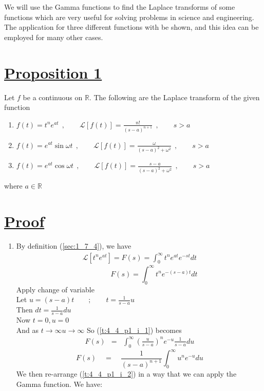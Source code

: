 \documentclass[11pt]{report}
\newcommand{\ubt}[1]{\textbf{\underline{#1}}}
\newcommand{\refn}[1]{(\ref{#1})}
\newcommand{\dsp}{\displaystyle}
\newcommand{\real}{ \mathbb{R}}
\newcommand{\Laplace}{\mathcal{L}}
\newcommand{\ft}{f(t)}
\newcommand{\LFn}[1]{\Laplace \sbracket{#1}}
\newcommand{\LFt}{\Laplace \sbracket{\ft}}
\newcommand{\sbracket}[1]{\left[#1\right]}
\newcommand{\proposition}[1]{\section*{\ubt{Proposition #1}}}
\begin{document}
	We will use the Gamma functions to find the Laplace transforms of some functions which are very useful for solving problems in science and engineering. The application for three different functions with be shown, and this idea can be employed for many other cases. 
	
	\proposition{1}
	Let $f$ be a continuous on $\real$. The following are the Laplace transform of the given function
	\begin{enumerate}
		\item $\dsp f(t) = t^ne^{at}~~,\qquad \LFt = \frac{n!}{(s-a)^{n+1}}~~, \qquad s > a $
		
		\item $\dsp f(t) = e^{at}\sin \omega t~~, \qquad \LFt = \frac{\omega}{(s-a)^2 + \omega^2}~~, \qquad s > a $
		
		\item $\dsp \ft = e^{at}\cos\omega t~~, \qquad \LFt = \frac{s-a}{(s-a)^2 + \omega^2}~~, \qquad s > a $
	\end{enumerate}
	where $a \in \real$
	
	\section*{\ubt{Proof}}
	\begin{enumerate}
		\item By definition \refn{sec:1_7_4}, we have
			\begin{eqnarray*}
				\LFn{t^ne^{at}} = F(s) = \int_0^\infty t^n e^{at} e^{-st}dt
			\end{eqnarray*}
			\begin{equation}
				{\qquad\qquad}F(s) = \int_0^\infty t^n e^{-(s-a)t}dt 	\tag{1}\label{t:4_4_p1_i_1}
			\end{equation}
			Apply change of variable\\
			Let $u=(s-a)t \qquad ; \qquad  t=\frac{1}{s-a}u$\\
			Then $dt = \frac{1}{s-a}du$\\
			Now $t=0, u= 0$\\
			And as $t\to \infty u \to \infty$
			So \refn{t:4_4_p1_i_1} becomes
			\begin{eqnarray*}
				F(s) &=& \int_0^\infty\left(\frac{u}{s-a}\right)^n e^{-u} \frac{1}{s-a}du
			\end{eqnarray*}
			\begin{equation}
				F(s) \quad= \quad\frac{1}{(s-a)^{n+1}}\int_0^\infty u^n e^{-u}du\tag{2}\label{t:4_4_p1_i_2}
			\end{equation}
			We then re-arrange \refn{t:4_4_p1_i_2} in a way that we can apply the Gamma function. We have:
	
	
	\end{enumerate}
\end{document}
